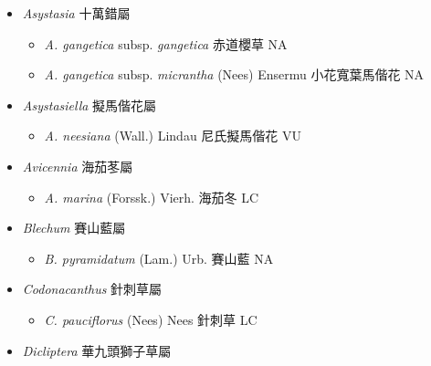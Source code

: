 
  \begin{itemize}
 \item[] \textit{Asystasia} 十萬錯屬
                                
  \begin{itemize}
        \item[] \textit{A. gangetica} subsp. \textit{gangetica}   赤道櫻草   NA
        \item[] \textit{A. gangetica} subsp. \textit{micrantha} (Nees) Ensermu  小花寬葉馬偕花   NA
  \end{itemize}
 \item[] \textit{Asystasiella} 擬馬偕花屬
                                
  \begin{itemize}
        \item[] \textit{A. neesiana} (Wall.) Lindau  尼氏擬馬偕花   VU
  \end{itemize}
 \item[] \textit{Avicennia} 海茄苳屬
                                
  \begin{itemize}
        \item[] \textit{A. marina} (Forssk.) Vierh.  海茄冬   LC
  \end{itemize}
 \item[] \textit{Blechum} 賽山藍屬
                                
  \begin{itemize}
        \item[] \textit{B. pyramidatum} (Lam.) Urb.  賽山藍   NA
  \end{itemize}
 \item[] \textit{Codonacanthus} 針刺草屬
                                
  \begin{itemize}
        \item[] \textit{C. pauciflorus} (Nees) Nees  針刺草   LC
  \end{itemize}
 \item[] \textit{Dicliptera} 華九頭獅子草屬
                                

\end{itemize}
